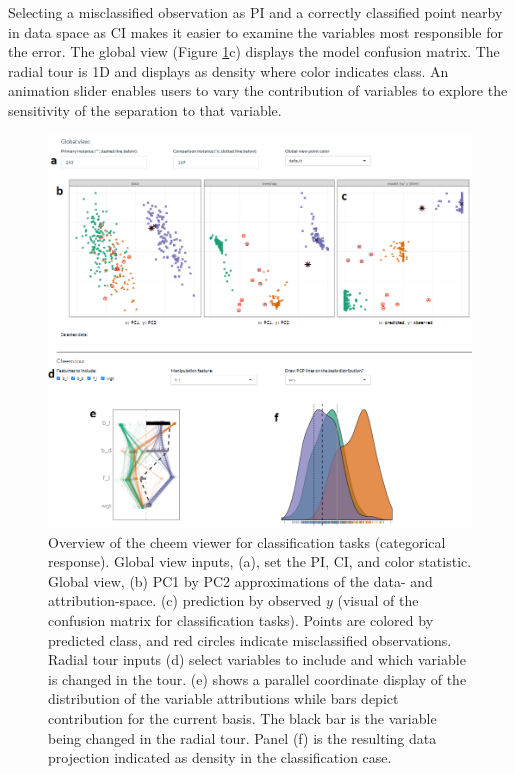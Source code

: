 \documentclass[
]{jss}
\begin{document}
Selecting a misclassified observation as PI and a correctly classified
point nearby in data space as CI makes it easier to examine the
variables most responsible for the error. The global view (Figure
\ref{fig:classificationcase}c) displays the model confusion matrix. The
radial tour is 1D and displays as density where color indicates class.
An animation slider enables users to vary the contribution of variables
to explore the sensitivity of the separation to that variable.

\begin{CodeChunk}
\begin{figure}

{\centering \includegraphics[width=1\linewidth]{./figures/app_classification} 

}

\caption[Overview of the cheem viewer for classification tasks (categorical response)]{Overview of the cheem viewer for classification tasks (categorical response). Global view inputs, (a), set the PI, CI, and color statistic. Global view, (b) PC1 by PC2 approximations of the data- and attribution-space. (c) prediction by observed $y$ (visual of the confusion matrix for classification tasks). Points are colored by predicted class, and red circles indicate misclassified observations. Radial tour inputs (d) select variables to include and which variable is changed in the tour. (e) shows a parallel coordinate display of the distribution of the variable attributions while bars depict contribution for the current basis. The black bar is the variable being changed in the radial tour. Panel (f) is the resulting data projection indicated as density in the classification case.}\label{fig:classificationcase}
\end{figure}
\end{CodeChunk}
\end{document}
